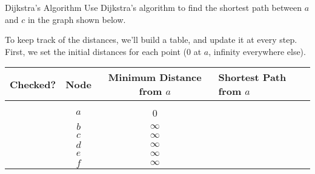 \begin{example}{Dijkstra's Algorithm}
Use Dijkstra's algorithm to find the shortest path between $a$ and $c$ in the graph shown below.
\begin{center}
\end{center}

\sol
To keep track of the distances, we'll build a table, and update it at every step.  First, we set the initial distances for each point (0 at $a$, infinity everywhere else).
\begin{center}
\begin{tabular}{c c c l}
\textbf{Checked?} & \textbf{Node} & \textbf{Minimum Distance from $a$} & \textbf{Shortest Path from $a$}\\
\hline
& & \\
& $a$ & 0 & \\
& $b$ & $\infty$ & \\
& $c$ & $\infty$ & \\
& $d$ & $\infty$ & \\
& $e$ & $\infty$ & \\
& $f$ & $\infty$ & \\
\end{tabular}
\end{center}


\end{example}
